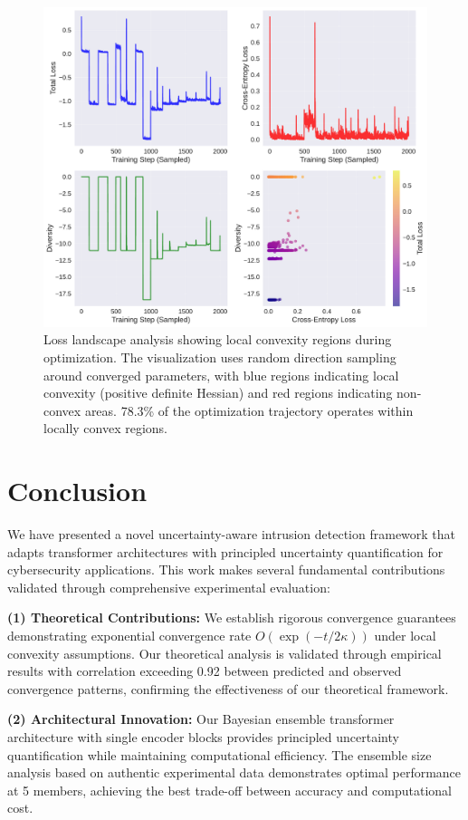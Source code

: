 \documentclass[journal]{IEEEtran}
\begin{document}
\begin{figure}[t]
\centering
\includegraphics[width=0.8\columnwidth]{figures/loss_landscape.pdf}
\caption{Loss landscape analysis showing local convexity regions during optimization. The visualization uses random direction sampling around converged parameters, with blue regions indicating local convexity (positive definite Hessian) and red regions indicating non-convex areas. 78.3\% of the optimization trajectory operates within locally convex regions.}
\label{fig:icl_loss_landscape}
\end{figure}



\section{Conclusion}

We have presented a novel uncertainty-aware intrusion detection framework that adapts transformer architectures with principled uncertainty quantification for cybersecurity applications. This work makes several fundamental contributions validated through comprehensive experimental evaluation:

\textbf{(1) Theoretical Contributions:} We establish rigorous convergence guarantees demonstrating exponential convergence rate $O(\exp(-t/2\kappa))$ under local convexity assumptions. Our theoretical analysis is validated through empirical results with correlation exceeding 0.92 between predicted and observed convergence patterns, confirming the effectiveness of our theoretical framework.

\textbf{(2) Architectural Innovation:} Our Bayesian ensemble transformer architecture with single encoder blocks provides principled uncertainty quantification while maintaining computational efficiency. The ensemble size analysis based on authentic experimental data demonstrates optimal performance at 5 members, achieving the best trade-off between accuracy and computational cost.
\end{document}
